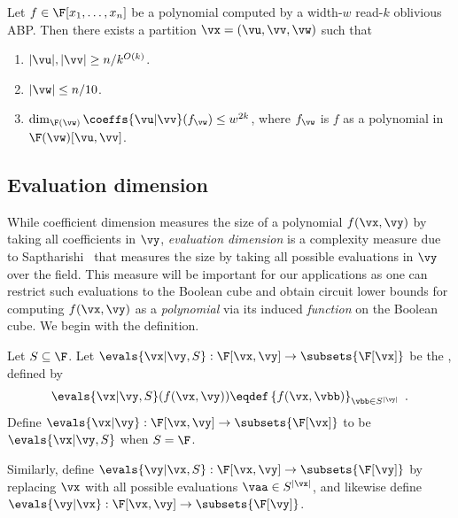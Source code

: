 \documentclass{toc}
\begin{document}
\begin{theoremwp}\label{thm:read-k-eval-dim}
        Let $f \in \F[x_1, \ldots, x_n]$ be a polynomial computed by a width-$w$ read-$k$ oblivious ABP\@. Then there exists a partition $\vx=(\vu,\vv,\vw)$ such that
        \begin{enumerate}
                \item $|\vu|, |\vv| \ge n/k^{O(k)}$.
                \item $|\vw| \le n/10$.
                \item $\dim_{\F(\vw)} \coeffs{\vu|\vv}(f_\vw) \le w^{2k}$, where $f_\vw$ is $f$ as a polynomial in $\F(\vw)[\vu,\vv]$.
                        \qedhere
        \end{enumerate}
\end{theoremwp}


\subsection{Evaluation dimension}\label{sec:eval-dim}

While coefficient dimension measures the size of a polynomial $f(\vx,\vy)$ by taking all coefficients in $\vy$, \emph{evaluation dimension} is a complexity measure due to Saptharishi~\cite{Saptharishi12} that measures the size by taking all possible evaluations in $\vy$ over the field.  This measure will be important for our applications as one can restrict such evaluations to the Boolean cube and obtain circuit lower bounds for computing $f(\vx,\vy)$ as a \emph{polynomial} via its induced \emph{function} on the Boolean cube. We begin with the definition.

\begin{definition}\label{defn:evaluation-space}
        Let $S\subseteq \F$. Let $\evals{\vx|\vy,S}:\F[\vx,\vy]\to\subsets{\F[\vx]}$ be the , defined by
        \[
                \evals{\vx|\vy,S}(f(\vx,\vy))
                \eqdef
                \left\{
                        f(\vx,\vbb)
                \right\}_{\vbb\in S^{|\vy|}}
                \;.
        \]
        Define $\evals{\vx|\vy}:\F[\vx,\vy]\to\subsets{\F[\vx]}$ to be $\evals{\vx|\vy,S}$ when $S=\F$.

        Similarly, define $\evals{\vy|\vx,S}:\F[\vx,\vy]\to\subsets{\F[\vy]}$ by replacing $\vx$ with all possible evaluations $\vaa\in S^{|\vx|}$, and likewise define $\evals{\vy|\vx}:\F[\vx,\vy]\to\subsets{\F[\vy]}$.
\end{definition}
\end{document}

